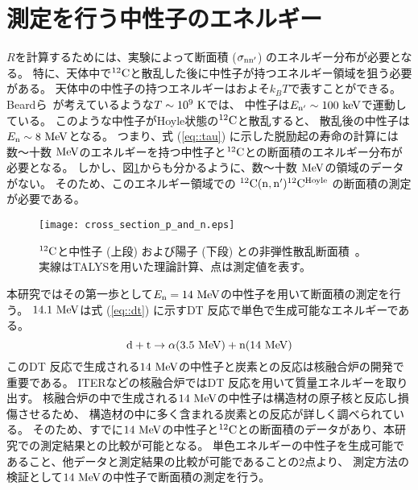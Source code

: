 \documentclass[../master]{subfiles}
\begin{document}
\section{測定を行う中性子のエネルギー}
$R$を計算するためには、実験によって断面積 ($\sigma_{\rm nn'}$) のエネルギー分布が必要となる。
特に、天体中で${}^{12}{\rm C}$と散乱した後に中性子が持つエネルギー領域を狙う必要がある。
天体中の中性子の持つエネルギーはおよそ$k_{B}T$で表すことができる。
Beardら~\cite{hotdensemedium}が考えているような$T\sim10^{9}~{\rm K}$では、
中性子は$E_{\rm n'}\sim100~{\rm keV}$で運動している。%
このような中性子がHoyle状態の${}^{12}{\rm C}$と散乱すると、
散乱後の中性子は$E_{\rm n}\sim8~{\rm MeV}$となる。
つまり、式 (\ref{eq::tau}) に示した脱励起の寿命の計算には
数〜十数 ${\rm MeV}$のエネルギーを持つ中性子と${}^{12}{\rm C}$との断面積のエネルギー分布が必要となる。
しかし、図\ref{fig::crosssection_pres}からも分かるように、数〜十数 ${\rm MeV}$の領域のデータがない。
そのため、このエネルギー領域での ${}^{12}{\rm C}({\rm n,n'}){}^{12}{\rm C}^{{\rm Hoyle}}$ の断面積の測定が必要である。
\begin{figure}
  \centering
  \texttt{[image: cross\_section\_p\_and\_n.eps]}
  \caption[${}^{12}{\rm C}$と中性子 (上段) および陽子 (下段) との非弾性散乱断面積。]
          {${}^{12}{\rm C}$と中性子 (上段) および陽子 (下段) との非弾性散乱断面積~\cite{hotdensemedium}。
  実線はTALYSを用いた理論計算、点は測定値を表す。}
  \label{fig::crosssection_pres}
\end{figure}

本研究ではその第一歩として$E_{\rm n} = 14~{\rm MeV}$の中性子を用いて断面積の測定を行う。
$14.1~{\rm MeV}$は式 (\ref{eq::dt}) に示すDT 反応で単色で生成可能なエネルギーである。
\begin{equation}
  {\rm d} + {\rm t} \rightarrow \alpha (3.5~{\rm MeV}) + {\rm n} (14~{\rm MeV})
  \label{eq::dt}
\end{equation}
このDT 反応で生成される$14~{\rm MeV}$の中性子と炭素との反応は核融合炉の開発で重要である。
ITERなどの核融合炉ではDT 反応を用いて質量エネルギーを取り出す。
核融合炉の中で生成される$14~{\rm MeV}$の中性子は構造材の原子核と反応し損傷させるため、
構造材の中に多く含まれる炭素との反応が詳しく調べられている。
そのため、すでに$14~{\rm MeV}$の中性子と${}^{12}{\rm C}$との断面積のデータがあり、本研究での測定結果との比較が可能となる。
単色エネルギーの中性子を生成可能であること、他データと測定結果の比較が可能であることの2点より、
測定方法の検証として$14~{\rm MeV}$の中性子で断面積の測定を行う。
\end{document}
